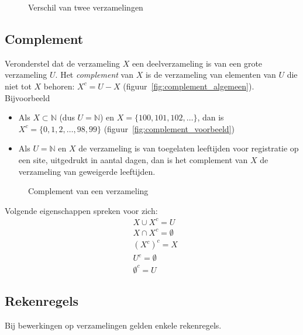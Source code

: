 \begin{figure}[htbp]
\centering
{}\qquad
\subfloat[$\{1,2,3,4\}-\{ 3,4,5,6\}=\{1,2\}$]{
    
    \label{fig:verschil_voorbeeld}
}
\caption{Verschil van twee verzamelingen}
\end{figure}

\subsection{Complement}
Veronderstel dat de verzameling $X$ een deelverzameling is van een grote verzameling $U$. Het \emph{complement}  van $X$ is de verzameling van elementen van $U$ die niet tot $X$ behoren: $X^c=U-X$ (figuur~\ref{fig:complement_algemeen}). Bijvoorbeeld
\begin{itemize}
\item Als $X\subset \mathbb{N}$ (dus $U=\mathbb{N}$) en $X=\{100,101,102,\dots\}$, dan is $X^c=\{0,1,2,\dots,98,99\}$ (figuur~\ref{fig:complement_voorbeeld})
\item Als $U=\mathbb{N}$ en $X$ de verzameling is van toegelaten leeftijden voor registratie op een site, uitgedrukt in aantal dagen, dan is het complement van $X$ de verzameling van geweigerde leeftijden.
\end{itemize}

\begin{figure}
\centering
{}\qquad
\subfloat[$ \{100,101,102,\dots\}^c=\{0,1,2,\dots,98,99\}$ als $U=\mathbb{N}$]{
    
    \label{fig:complement_voorbeeld}
}
\caption{Complement van een verzameling}
\end{figure}
Volgende eigenschappen spreken voor zich:
\begin{equation*}
\begin{split}
&X\cup X^c=U \\
&X\cap X^c=\emptyset\\
&(X^c)^c=X\\
& U^c=\emptyset \\
&\emptyset^c=U
\end{split}
\end{equation*}

\subsection{Rekenregels}
\label{subsec:verzRekenregels}
Bij bewerkingen op verzamelingen gelden enkele rekenregels.

